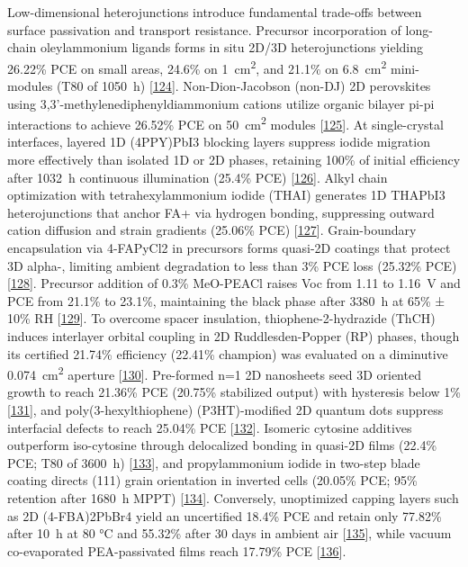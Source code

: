 \documentclass[
  11pt,
]{article}
\begin{document}
Low-dimensional heterojunctions introduce fundamental trade-offs between
surface passivation and transport resistance. Precursor incorporation of
long-chain oleylammonium ligands forms in situ 2D/3D heterojunctions
yielding 26.22\% PCE on small areas, 24.6\% on
\qty{1}{\centi\meter\squared}, and 21.1\% on
\qty{6.8}{\centi\meter\squared} mini-modules (T80 of \qty{1050}{\hour})
{[}\href{https://doi.org/10.1007/s40820-025-02058-8}{124}{]}.
Non-Dion-Jacobson (non-DJ) 2D perovskites using
3,3'-methylenediphenyldiammonium cations utilize organic bilayer pi-pi
interactions to achieve 26.52\% PCE on \qty{50}{\centi\meter\squared}
modules {[}\href{https://doi.org/10.1002/anie.2974414}{125}{]}. At
single-crystal interfaces, layered 1D (4PPY)PbI3 blocking layers
suppress iodide migration more effectively than isolated 1D or 2D
phases, retaining 100\% of initial efficiency after \qty{1032}{\hour}
continuous illumination (25.4\% PCE)
{[}\href{https://doi.org/10.1002/adfm.75386}{126}{]}. Alkyl chain
optimization with tetrahexylammonium iodide (THAI) generates 1D THAPbI3
heterojunctions that anchor FA+ via hydrogen bonding, suppressing
outward cation diffusion and strain gradients (25.06\% PCE)
{[}\href{https://doi.org/10.1021/acsaem.6c01363}{127}{]}. Grain-boundary
encapsulation via 4-FAPyCl2 in  precursors forms quasi-2D
coatings that protect 3D alpha-, limiting ambient degradation
to less than 3\% PCE loss (25.32\% PCE)
{[}\href{https://doi.org/10.1002/adfm.202531852}{128}{]}. Precursor
addition of 0.3\% MeO-PEACl raises Voc from 1.11 to \qty{1.16}{\volt}
and PCE from 21.1\% to 23.1\%, maintaining the black phase after
\qty{3380}{\hour} at 65\% ± 10\% RH
{[}\href{https://doi.org/10.1002/smll.73351}{129}{]}. To overcome spacer
insulation, thiophene-2-hydrazide (ThCH) induces interlayer orbital
coupling in 2D Ruddlesden-Popper (RP) phases, though its certified
21.74\% efficiency (22.41\% champion) was evaluated on a diminutive
\qty{0.074}{\centi\meter\squared} aperture
{[}\href{https://doi.org/10.1002/anie.4293157}{130}{]}. Pre-formed n=1
2D nanosheets seed 3D oriented growth to reach 21.36\% PCE (20.75\%
stabilized output) with hysteresis below 1\%
{[}\href{https://doi.org/10.1002/smll.74076}{131}{]}, and
poly(3-hexylthiophene) (P3HT)-modified 2D quantum dots suppress
interfacial defects to reach 25.04\% PCE
{[}\href{https://doi.org/10.1021/acsami.5c24915}{132}{]}. Isomeric
cytosine additives outperform iso-cytosine through delocalized bonding
in quasi-2D films (22.4\% PCE; T80 of \qty{3600}{\hour})
{[}\href{https://doi.org/10.1021/acs.jpclett.6c01531}{133}{]}, and
propylammonium iodide in two-step blade coating directs (111) grain
orientation in inverted cells (20.05\% PCE; 95\% retention after
\qty{1680}{\hour} MPPT)
{[}\href{https://doi.org/10.1002/solr.70385}{134}{]}. Conversely,
unoptimized capping layers such as 2D (4-FBA)2PbBr4 yield an uncertified
18.4\% PCE and retain only 77.82\% after \qty{10}{\hour} at 80 °C and
55.32\% after 30 days in ambient air
{[}\href{https://doi.org/10.1021/acsaem.6c00285}{135}{]}, while vacuum
co-evaporated PEA-passivated films reach 17.79\% PCE
{[}\href{https://doi.org/10.1002/ente.202502217}{136}{]}.
\end{document}
